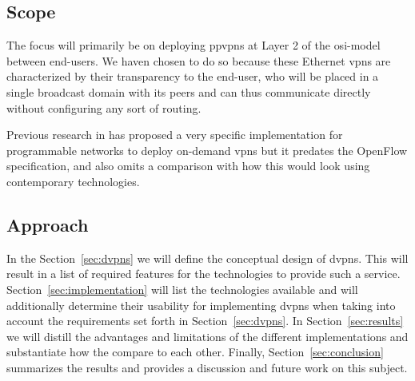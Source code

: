 
	\subsection{Scope} %
	\label{sub:scope}
	The focus will primarily be on deploying \acp{ppvpn} at Layer 2 of the \acs{osi}-model between end-users. We haven chosen to do so because these Ethernet \acp{vpn} are characterized by their transparency to the end-user, who will be placed in a single broadcast domain with its peers and can thus communicate directly without configuring any sort of routing.
	
	Previous research in \cite{net-prog-vpn} has proposed a very specific implementation for programmable networks to deploy on-demand \acp{vpn} but it predates the OpenFlow specification, and also omits a comparison with how this would look using contemporary technologies.


	\subsection{Approach} %
	\label{sub:approach}
	In the Section~\ref{sec:dvpns} we will define the conceptual design of \acp{dvpn}. This will result in a list of required features for the technologies to provide such a service. Section~\ref{sec:implementation} will list the technologies available and will additionally determine their usability for implementing \acp{dvpn} when taking into account the requirements set forth in Section~\ref{sec:dvpns}. In Section~\ref{sec:results} we will distill the advantages and limitations of the different implementations and substantiate how the compare to each other. Finally, Section~\ref{sec:conclusion} summarizes the results and provides a discussion and future work on this subject.


